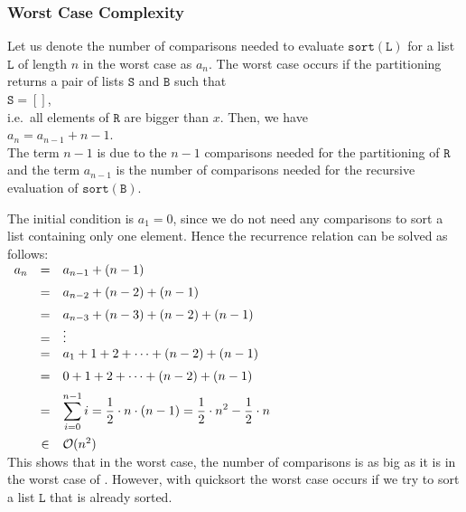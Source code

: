 \subsubsection{Worst Case Complexity}
Let us denote the number of comparisons needed to evaluate $\mathtt{sort}(\mathtt{L})$ for a list $\mathtt{L}$ of
length $n$ in the worst case as $a_n$.  The worst case occurs if the partitioning
returns a pair of lists $\mathtt{S}$ and $\mathtt{B}$ such that
\\[0.2cm]
\hspace*{1.3cm}
$\mathtt{S} = []$,
\\[0.2cm]
i.e.~all elements of $\mathtt{R}$ are bigger than $x$.  Then, we have
\\[0.2cm]
\hspace*{1.3cm}
$a_n = a_{n-1} + n - 1$. 
\\[0.2cm]
The term $n-1$ is due to the $n-1$ comparisons needed for the partitioning of $\mathtt{R}$
and the term $a_{n-1}$ is the number of comparisons needed for the recursive evaluation of $\mathtt{sort}(\mathtt{B})$.

The initial condition is $a_1 = 0$, since we do not need any comparisons to sort a list
containing only one element.
Hence the recurrence relation can be solved as follows:
\\[0.2cm]
\hspace*{1.3cm}
$
\begin{array}{lcl}
  a_n & = & a_{n-1} + (n-1) \\[0.2cm]
      & = & a_{n-2} + (n-2) + (n-1) \\[0.2cm]
      & = & a_{n-3} + (n-3) + (n-2) + (n-1) \\
      & = & \vdots \\
      & = & a_{1} + 1 + 2 + \cdots  + (n-2) + (n-1) \\[0.2cm]
      & = & 0 + 1 + 2 + \cdots  + (n-2) + (n-1) \\[0.2cm]
      & = & \displaystyle \sum\limits_{i=0}^{n-1} i  =  \frac{1}{2} \cdot n \cdot(n - 1) =
            \frac{1}{2} \cdot n^2 - \frac{1}{2} \cdot n \\[0.5cm]
      & \in & \mathcal{O}(n^2)
\end{array}
$
\\[0.2cm]
This shows that in the worst case, the number of comparisons is as big as it is in the worst case of 
.  However, with quicksort the worst case occurs if we try to sort a list $\mathtt{L}$ that is
already sorted. 


